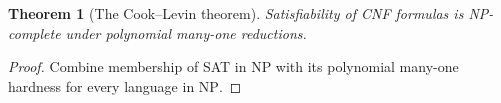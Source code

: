 \documentclass[11pt]{article}
\newtheorem{theorem}{Theorem}
\theoremstyle{definition}
\begin{document}
\begin{theorem}[The Cook–Levin theorem]\leavevmode
Satisfiability of CNF formulas is NP-complete under polynomial many-one reductions.

\end{theorem}
\begin{proof}\leavevmode
Combine membership of SAT in $\mathrm{NP}$ with its polynomial many-one hardness for every language in $\mathrm{NP}$.\qedhere
\end{proof}
\end{document}
